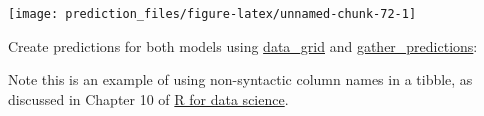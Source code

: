 \documentclass[]{book}
\newenvironment{Shaded}{\begin{snugshade}}{\end{snugshade}}
\newcommand{\KeywordTok}[1]{\textcolor[rgb]{0.13,0.29,0.53}{\textbf{#1}}}
\newcommand{\DataTypeTok}[1]{\textcolor[rgb]{0.13,0.29,0.53}{#1}}
\newcommand{\CharTok}[1]{\textcolor[rgb]{0.31,0.60,0.02}{#1}}
\newcommand{\StringTok}[1]{\textcolor[rgb]{0.31,0.60,0.02}{#1}}
\newcommand{\OperatorTok}[1]{\textcolor[rgb]{0.81,0.36,0.00}{\textbf{#1}}}
\newcommand{\NormalTok}[1]{#1}
\theoremstyle{definition}
\theoremstyle{definition}
\theoremstyle{definition}
\theoremstyle{remark}
\begin{document}
\begin{center}\texttt{[image: prediction\_files/figure-latex/unnamed-chunk-72-1]} \end{center}

Create predictions for both models using
\href{https://www.rdocumentation.org/packages/modelr/topics/data_grid}{data\_grid}
and
\href{https://www.rdocumentation.org/packages/modelr/topics/gather_predictions}{gather\_predictions}:

\begin{Shaded}
\end{Shaded}

Note this is an example of using non-syntactic column names in a tibble,
as discussed in Chapter 10 of
\href{http://r4ds.had.co.nz/tibbles.html}{R for data science}.
\end{document}
